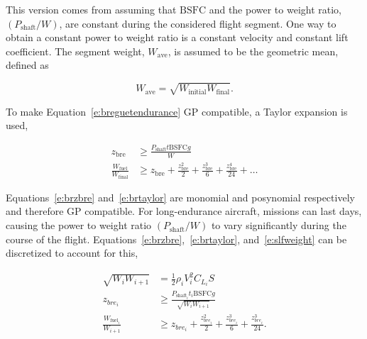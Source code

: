 This version comes from assuming that $\text{BSFC}$ and the power to weight ratio, $(P_{\text{shaft}}/W)$, are constant during the considered flight segment. 
One way to obtain a constant power to weight ratio is a constant velocity and constant lift coefficient.\cite{br2}
The segment weight, $W_{\text{ave}}$, is assumed to be the geometric mean, defined as

% 
% 
% 
% 

\begin{equation}
    \label{e:gpmean}
    W_{\text{ave}} = \sqrt{W_{\text{initial}}W_{\text{final}}}.
\end{equation}

    To make Equation~\eqref{e:breguetendurance} GP compatible, a Taylor expansion is used,\cite{hoburgthesis}

\begin{align}
    \label{e:brzbre}
    z_{\text{bre}} &\geq \frac{P_{\text{shaft}}t \text{BSFC} g}{W}\\
    \label{e:brtaylor}
    \frac{W_{\text{fuel}}}{W_\text{final}} &\geq z_{\text{bre}} + \frac{z_{\text{bre}}^2}{2} + \frac{z_{\text{bre}}^3}{6} + \frac{z_{\text{bre}}^4}{24} + \dots
\end{align}

    Equations~\eqref{e:brzbre} and~\eqref{e:brtaylor} are monomial and posynomial respectively and therefore GP compatible. For long-endurance aircraft, missions can last days, causing the power to weight ratio $(P_{\text{shaft}}/W)$ to vary significantly during the course of the flight.  
    Equations~\eqref{e:brzbre},~\eqref{e:brtaylor}, and~\eqref{e:slfweight} can be discretized to account for this,

\begin{align}
    \label{e:slfweightd}
    \sqrt{W_i W_{i+1}} &= \frac{1}{2} \rho_i V_i^2 C_{L_i} S \\
    \label{e:brzbred}
    z_{bre_i} &\geq \frac{P_{\text{shaft}_i}t_i \text{BSFC} g}{\sqrt{W_i W_{i+1}}}\\
    \label{e:brtaylord}
    \frac{W_{\text{fuel}_i}}{W_{i+1}} &\geq z_{bre_i} + \frac{z_{bre_i}^2}{2} + \frac{z_{bre_i}^3}{6} + \frac{z_{bre_i}^3}{24}.
    \end{align}

